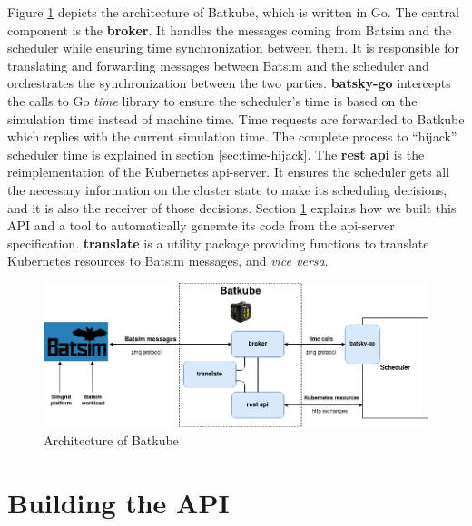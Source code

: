 Figure \ref{fig:batkube-architecture} depicts the architecture of Batkube,
which is written in Go.  The central component is the \textbf{broker}. It
handles the messages coming from Batsim and the scheduler while ensuring time
synchronization between them. It is responsible for translating and forwarding
messages between Batsim and the scheduler and orchestrates the synchronization
between the two parties.  \textbf{batsky-go} intercepts the calls to Go
\textit{time} library to ensure the scheduler's time is based on the simulation
time instead of machine time. Time requests are forwarded to Batkube which
replies with the current simulation time.  The complete process to ``hijack''
scheduler time is explained in section \ref{sec:time-hijack}. The \textbf{rest
api} is the reimplementation of the Kubernetes api-server. It ensures the
scheduler gets all the necessary information on the cluster state to make its
scheduling decisions, and it is also the receiver of those decisions. Section
\ref{sec:api} explains how we built this API and a tool to automatically
generate its code from the api-server specification.  \textbf{translate} is a
utility package providing functions to translate Kubernetes resources to Batsim
messages, and \textit{vice versa}.

\begin{figure}[h]
	\centering
	\includegraphics[width=\textwidth]{imgs/batkube-architecture-3-synchro.png}
	\caption{Architecture of Batkube}
	\label{fig:batkube-architecture}
\end{figure}

\section{Building the API} \label{sec:api}


